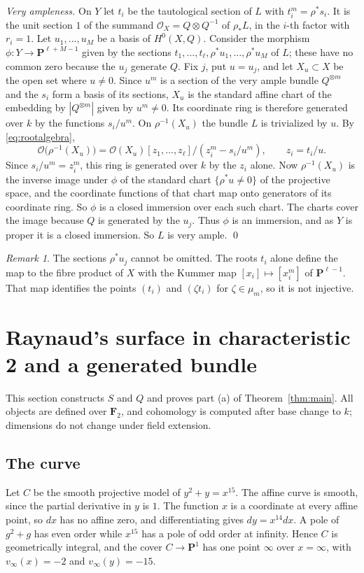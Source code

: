 \documentclass[11pt,a4paper]{article}
\theoremstyle{plain}
\theoremstyle{remark}
\newtheorem{remark}[theorem]{Remark}
\newcommand{\OO}{\mathcal O}
\newcommand{\F}{\mathbf F}
\newcommand{\PP}{\mathbf P}
\begin{document}
\emph{Very ampleness.} On $Y$ let $t_i$ be the tautological section of $L$ with $t_i^m=\rho^*s_i$. It is the unit
section $1$ of the summand $\OO_X=Q\otimes Q^{-1}$ of $\rho_*L$, in the $i$-th factor with $r_i=1$. Let
$u_1,\dots,u_M$ be a basis of $H^0(X,Q)$. Consider the morphism $\phi:Y\to\PP^{\ell+M-1}$ given by the sections
$t_1,\dots,t_\ell,\rho^*u_1,\dots,\rho^*u_M$ of $L$; these have no common zero because the $u_j$ generate $Q$. Fix $j$,
put $u=u_j$, and let $X_u\subset X$ be the open set where $u\ne0$. Since $u^m$ is a section of the very ample bundle
$Q^{\otimes m}$ and the $s_i$ form a basis of its sections, $X_u$ is the standard affine chart of the embedding by
$|Q^{\otimes m}|$ given by $u^m\ne0$. Its coordinate ring is therefore generated over $k$ by the functions $s_i/u^m$. On
$\rho^{-1}(X_u)$ the bundle $L$ is trivialized by $u$. By \eqref{eq:rootalgebra},
\[
 \OO\bigl(\rho^{-1}(X_u)\bigr)=\OO(X_u)[z_1,\dots,z_\ell]/(z_i^m-s_i/u^m),\qquad z_i=t_i/u .
\]
Since $s_i/u^m=z_i^m$, this ring is generated over $k$ by the $z_i$ alone. Now $\rho^{-1}(X_u)$ is the inverse image under
$\phi$ of the standard chart $\{\rho^*u\ne0\}$ of the projective space, and the coordinate functions of that chart map
onto generators of its coordinate ring. So $\phi$ is a closed immersion over each such chart. The charts cover the image
because $Q$ is generated by the $u_j$. Thus $\phi$ is an immersion, and as $Y$ is proper it is a closed immersion. So
$L$ is very ample. \qed

\begin{remark}
The sections $\rho^*u_j$ cannot be omitted. The roots $t_i$ alone define the map to the fibre product of $X$ with the
Kummer map $[x_i]\mapsto[x_i^m]$ of $\PP^{\ell-1}$. That map identifies the points $(t_i)$ and $(\zeta t_i)$ for
$\zeta\in\mu_m$, so it is not injective.
\end{remark}

\section{Raynaud's surface in characteristic 2 and a generated bundle}

This section constructs $S$ and $Q$ and proves part (a) of Theorem~\ref{thm:main}. All objects are defined over $\F_2$,
and cohomology is computed after base change to $k$; dimensions do not change under field extension.

\subsection{The curve}
Let $C$ be the smooth projective model of $y^2+y=x^{15}$. The affine curve is smooth, since the partial derivative in
$y$ is $1$. The function $x$ is a coordinate at every affine point, so $dx$ has no affine zero, and differentiating gives
$dy=x^{14}dx$. A pole of $g^2+g$ has even order while $x^{15}$ has a pole of odd order at infinity. Hence $C$ is
geometrically integral, and the cover $C\to\PP^1$ has one point $\infty$ over $x=\infty$, with $v_\infty(x)=-2$ and
$v_\infty(y)=-15$.
\end{document}
